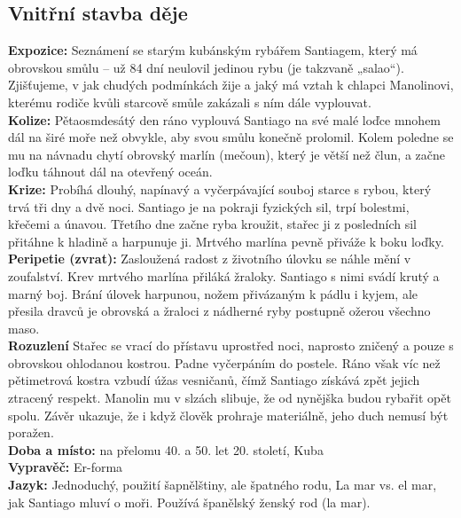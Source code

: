 \documentclass[12pt, a4paper]{article}
\newcommand{\mybf}[1]{\textcolor[RGB]{0, 179, 219}{\textbf{#1}}}
\begin{document}
\subsection*{Vnitřní stavba děje}
\noindent\textbf{Expozice:} Seznámení se starým kubánským rybářem Santiagem, který má obrovskou smůlu – už 84 dní neulovil jedinou rybu (je takzvaně „salao“). Zjišťujeme, v jak chudých podmínkách žije a jaký má vztah k chlapci Manolinovi, kterému rodiče kvůli starcově smůle zakázali s ním dále vyplouvat.\\[10pt] 
\noindent\textbf{Kolize:} Pětaosmdesátý den ráno vyplouvá Santiago na své malé loďce mnohem dál na širé moře než obvykle, aby svou smůlu konečně prolomil. Kolem poledne se mu na návnadu chytí obrovský marlín (mečoun), který je větší než člun, a začne loďku táhnout dál na otevřený oceán.\\[10pt]
\noindent\textbf{Krize:} Probíhá dlouhý, napínavý a vyčerpávající souboj starce s rybou, který trvá tři dny a dvě noci. Santiago je na pokraji fyzických sil, trpí bolestmi, křečemi a únavou. Třetího dne začne ryba kroužit, stařec ji z posledních sil přitáhne k hladině a harpunuje ji. Mrtvého marlína pevně přiváže k boku loďky.\\[10pt]
\noindent\textbf{Peripetie (zvrat):} Zasloužená radost z životního úlovku se náhle mění v zoufalství. Krev mrtvého marlína přiláká žraloky. Santiago s nimi svádí krutý a marný boj. Brání úlovek harpunou, nožem přivázaným k pádlu i kyjem, ale přesila dravců je obrovská a žraloci z nádherné ryby postupně ožerou všechno maso.\\[10pt]
\noindent\textbf{Rozuzlení} Stařec se vrací do přístavu uprostřed noci, naprosto zničený a pouze s obrovskou ohlodanou kostrou. Padne vyčerpáním do postele. Ráno však víc než pětimetrová kostra vzbudí úžas vesničanů, čímž Santiago získává zpět jejich ztracený respekt. Manolin mu v slzách slibuje, že od nynějška budou rybařit opět spolu. Závěr ukazuje, že i když člověk prohraje materiálně, jeho duch nemusí být poražen.\\[10pt]
\mybf{Doba a místo:} na přelomu 40. a 50. let 20. století, Kuba\\[10pt]
\mybf{Vypravěč:} Er-forma\\[10pt]
\mybf{Jazyk:} Jednoduchý, použití šapnělštiny, ale špatného rodu, La mar vs. el mar, jak Santiago mluví o moři. Používá španělský ženský rod (la mar).
\end{document}
